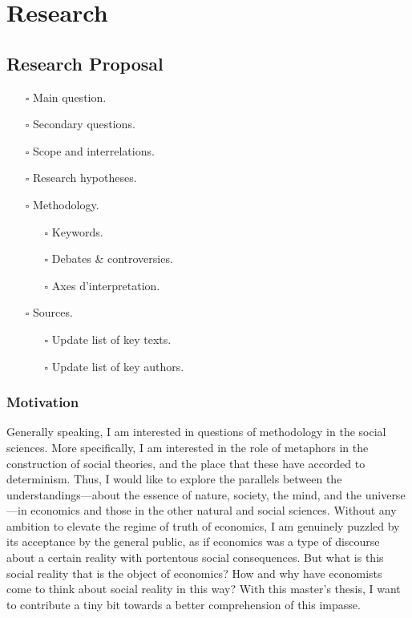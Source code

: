\documentclass[paper=A4,portrait,twoside=true,twocolumn=true,headinclude=false,footinclude=false,fontsize=10,BCOR=15mm,DIV=13,pagesize=auto,titlepage=firstiscover,mpinclude=true,open=right,chapterprefix=true,numbers=autoendperiod,headsepline=false,parskip=false]{scrbook}
\theoremstyle{definition}
\begin{document}
\part{Research}
\label{sec:org0ce425b}
\chapter{Research Proposal}
\label{sec:org43c8467}
\begin{itemize}
\item[{$\square$}] Main question.
\end{itemize}
\begin{itemize}
\item[{$\square$}] Secondary questions.
\item[{$\square$}] Scope and interrelations.
\item[{$\square$}] Research hypotheses.
\item[{$\square$}] Methodology.
\begin{itemize}
\item[{$\square$}] Keywords.
\item[{$\square$}] Debates \& controversies.
\item[{$\square$}] Axes d'interpretation.
\end{itemize}
\item[{$\square$}] Sources.
\begin{itemize}
\item[{$\square$}] Update list of key texts.
\item[{$\square$}] Update list of key authors.
\end{itemize}
\end{itemize}
\section{Motivation}
\label{sec:org9f06641}
Generally speaking, I am interested in questions of methodology in the
social sciences. More specifically, I am interested in the role of
metaphors in the construction of social theories, and the place that these
have accorded to determinism. Thus, I would like to explore the parallels
between the understandings---about the essence of nature, society, the
mind, and the universe---in economics and those in the other natural and
social sciences. Without any ambition to elevate the regime of truth of
economics, I am genuinely puzzled by its acceptance by the general public,
as if economics was a type of discourse about a certain reality with
portentous social consequences. But what is this social reality that is the
object of economics? How and why have economists come to think about social
reality in this way? With this master's thesis, I want to contribute a tiny
bit towards a better comprehension of this impasse.
\end{document}
